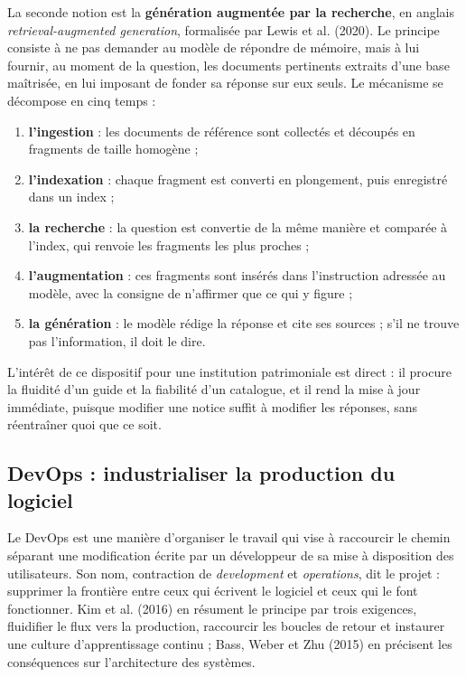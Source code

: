 La seconde notion est la \textbf{génération augmentée par la recherche}, en
anglais \emph{retrieval-augmented generation}, formalisée par Lewis et al.
(2020). Le principe consiste à ne pas demander au modèle de répondre de mémoire,
mais à lui fournir, au moment de la question, les documents pertinents extraits
d'une base maîtrisée, en lui imposant de fonder sa réponse sur eux seuls. Le
mécanisme se décompose en cinq temps :

\begin{enumerate}
  \item \textbf{l'ingestion} : les documents de référence sont collectés et
        découpés en fragments de taille homogène ;
  \item \textbf{l'indexation} : chaque fragment est converti en plongement, puis
        enregistré dans un index ;
  \item \textbf{la recherche} : la question est convertie de la même manière et
        comparée à l'index, qui renvoie les fragments les plus proches ;
  \item \textbf{l'augmentation} : ces fragments sont insérés dans l'instruction
        adressée au modèle, avec la consigne de n'affirmer que ce qui y figure ;
  \item \textbf{la génération} : le modèle rédige la réponse et cite ses
        sources ; s'il ne trouve pas l'information, il doit le dire.
\end{enumerate}

L'intérêt de ce dispositif pour une institution patrimoniale est direct : il
procure la fluidité d'un guide et la fiabilité d'un catalogue, et il rend la
mise à jour immédiate, puisque modifier une notice suffit à modifier les
réponses, sans réentraîner quoi que ce soit.

\subsection{DevOps : industrialiser la production du logiciel}

Le DevOps est une manière d'organiser le travail qui vise à raccourcir le chemin
séparant une modification écrite par un développeur de sa mise à disposition des
utilisateurs. Son nom, contraction de \emph{development} et \emph{operations},
dit le projet : supprimer la frontière entre ceux qui écrivent le logiciel et
ceux qui le font fonctionner. Kim et al. (2016) en résument le principe par
trois exigences, fluidifier le flux vers la production, raccourcir les boucles
de retour et instaurer une culture d'apprentissage continu ; Bass, Weber et Zhu
(2015) en précisent les conséquences sur l'architecture des systèmes.

